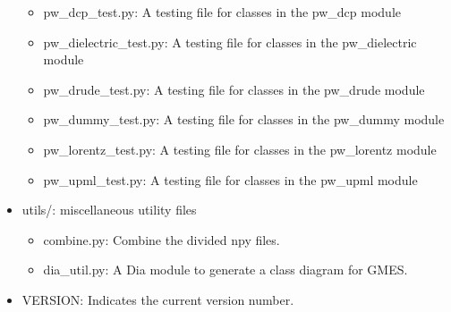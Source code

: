\begin{itemize}
\begin{itemize}
      \item pw\_dcp\_test.py: A testing file for classes in the pw\_dcp module
      \item pw\_dielectric\_test.py: A testing file for classes in the pw\_dielectric module
      \item pw\_drude\_test.py: A testing file for classes in the pw\_drude module
      \item pw\_dummy\_test.py: A testing file for classes in the pw\_dummy module
      \item pw\_lorentz\_test.py: A testing file for classes in the pw\_lorentz module
      \item pw\_upml\_test.py: A testing file for classes in the pw\_upml module
  \end{itemize}
\item utils/: miscellaneous utility files
  \begin{itemize}
  \item combine.py: Combine the divided npy files.
  \item dia\_util.py: A Dia module to generate a class diagram for GMES.
  \end{itemize}
\item VERSION: Indicates the current version number.
\end{itemize}
